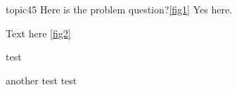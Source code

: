 \begin{problem}[requires=some label]{topic}{45}
	Here is the problem question?\ref{fig1}
\label{   label 1   }
Yes here.
	
\begin{answers}
\answer[correct] Text here \ref{fig2}

    test

\answer[correct] another test
             test
\end {answers}
 
 \end{problem}